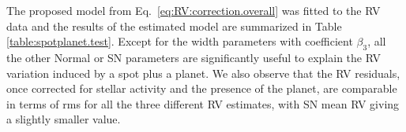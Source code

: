 \documentclass{aa}
\begin{document}
The proposed model from Eq.~\ref{eq:RV:correction.overall} was fitted to the RV data and the results of the estimated model are summarized in Table \ref{table:spotplanet.test}.   Except for the width parameters with coefficient $\beta_3$, all the other Normal or SN parameters are significantly useful to explain the RV variation induced by a spot plus a planet. We also observe that the RV residuals, once corrected for stellar activity and the presence of the planet, are comparable in terms of rms for all the three different RV estimates, with SN mean RV giving a slightly smaller value.
\end{document}
